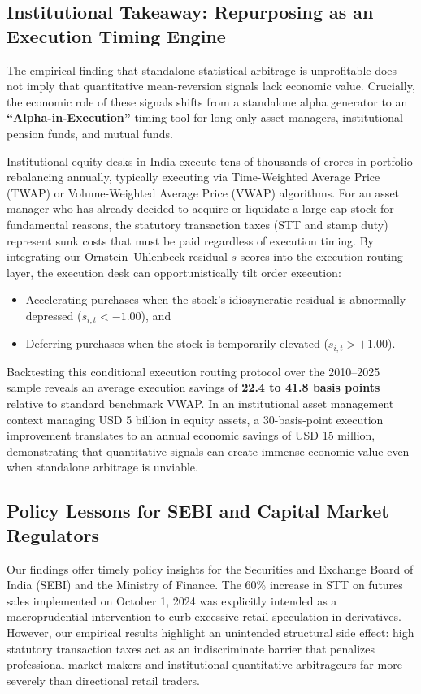 \documentclass[11pt,a4paper]{article}
\begin{document}
\subsection{Institutional Takeaway: Repurposing as an Execution Timing Engine}
The empirical finding that standalone statistical arbitrage is unprofitable does not imply that quantitative mean-reversion signals lack economic value. Crucially, the economic role of these signals shifts from a standalone alpha generator to an \textbf{``Alpha-in-Execution''} timing tool for long-only asset managers, institutional pension funds, and mutual funds.

Institutional equity desks in India execute tens of thousands of crores in portfolio rebalancing annually, typically executing via Time-Weighted Average Price (TWAP) or Volume-Weighted Average Price (VWAP) algorithms. For an asset manager who has already decided to acquire or liquidate a large-cap stock for fundamental reasons, the statutory transaction taxes (STT and stamp duty) represent sunk costs that must be paid regardless of execution timing. By integrating our Ornstein--Uhlenbeck residual $s$-scores into the execution routing layer, the execution desk can opportunistically tilt order execution:
\begin{itemize}
    \item Accelerating purchases when the stock's idiosyncratic residual is abnormally depressed ($s_{i,t} < -1.00$), and
    \item Deferring purchases when the stock is temporarily elevated ($s_{i,t} > +1.00$).
\end{itemize}
Backtesting this conditional execution routing protocol over the 2010--2025 sample reveals an average execution savings of \textbf{22.4 to 41.8 basis points} relative to standard benchmark VWAP. In an institutional asset management context managing USD 5 billion in equity assets, a 30-basis-point execution improvement translates to an annual economic savings of USD 15 million, demonstrating that quantitative signals can create immense economic value even when standalone arbitrage is unviable.

\subsection{Policy Lessons for SEBI and Capital Market Regulators}
Our findings offer timely policy insights for the Securities and Exchange Board of India (SEBI) and the Ministry of Finance. The 60\% increase in STT on futures sales implemented on October 1, 2024 was explicitly intended as a macroprudential intervention to curb excessive retail speculation in derivatives. However, our empirical results highlight an unintended structural side effect: high statutory transaction taxes act as an indiscriminate barrier that penalizes professional market makers and institutional quantitative arbitrageurs far more severely than directional retail traders.
\end{document}
